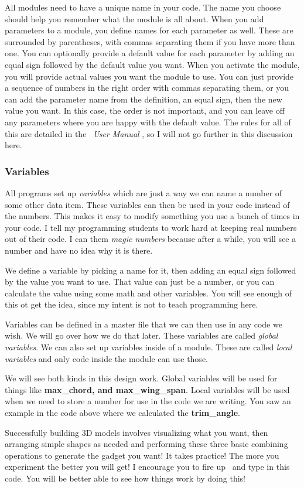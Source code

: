 All modules need to have a unique name in your code.  The name you choose should
help you remember what the module is all about. When you add parameters to a
module, you define names for each parameter as well. These are surrounded by
parentheses, with commas separating them if you have more than one. You can
optionally provide a default value for each parameter by adding an equal sign
followed by the default value you want. When you activate the module, you will
provide actual values you want the module to use. You can just provide a
sequence of numbers in the right order with commas separating them, or you can
add the parameter name from the definition, an equal sign, then the new value
you want. In this case, the order is not important, and you can leave off any
parameters where you are happy with the default value.  The rules for all of
this are detailed in the \osc\ {\it User Manual} \cite{userman}, so I will not
go further in this discussion here.

\subsubsection{Variables}

All programs set up {\it variables} which are just a way we can name a number of
some other data item. These variables can then be used in your code instead of
the numbers. This makes it easy to modify something you use a bunch of times in
your code. I tell my programming students to work hard at keeping real
numbers out of their code. I can them {\it magic numbers} because after a
while, you will see a number and have no idea why it is there.

We define a variable by picking a name for it, then adding an equal sign
followed by the value you want to use. That value can just be a number, or you
can calculate the value using some math and other variables. You will see enough
of this ot get the idea, since my intent is not to teach programming here.

Variables can be defined in a master file that we can then use in any code we
wish. We will go over how we do that later. These variables are called {\it
global variables}. We can also set up variables inside of a module. These are
called {\it local variables} and only code inside the module can use those.

We will see both kinds in this design work. Global variables will be used for
things like {\bf max\_chord, and max\_wing\_span}. Local variables will be used
when we need to store a number for use in the code we are writing. You saw an
example in the code above where we calculated the {\bf trim\_angle}.

Successfully building 3D models involves visualizing what you want, then
arranging simple shapes as needed and performing these three basic combining
operations to generate the gadget you want! It takes practice! The more you
experiment the better you will get! I encourage you to fire up \osc\ and type
in this code. You will be better able to see how things work by doing this!

